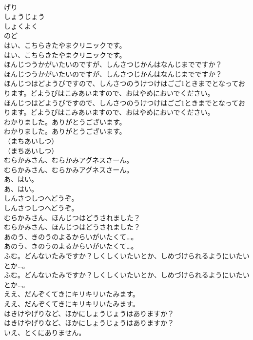 \documentclass[8pt]{extreport}
\begin{document}
\begin{CJK}{UTF8}{min}
\\	げり
\\	しょうじょう
\\	しょくよく
\\	のど
\\	はい、こちらきたやまクリニックです。	
\\	はい、こちらきたやまクリニックです。 
\\	ほんじつうかがいたいのですが、しんさつじかんはなんじまでですか？	
\\	ほんじつうかがいたいのですが、しんさつじかんはなんじまでですか？ 
\\	ほんじつはどようびですので、しんさつのうけつけはごご1ときまでとなっております。どようびはこみあいますので、おはやめにおいでください。	
\\	ほんじつはどようびですので、しんさつのうけつけはごご1ときまでとなっております。どようびはこみあいますので、おはやめにおいでください。 
\\	わかりました。ありがとうございます。	
\\	わかりました。ありがとうございます。 
\\	（まちあいしつ）	
\\	（まちあいしつ） 
\\	むらかみさん、むらかみアグネスさーん。	
\\	むらかみさん、むらかみアグネスさーん。 
\\	あ、はい。	
\\	あ、はい。 
\\	しんさつしつへどうぞ。	
\\	しんさつしつへどうぞ。 
\\	むらかみさん、ほんじつはどうされました？	
\\	むらかみさん、ほんじつはどうされました？ 
\\	あのう、きのうのよるからいがいたくて…。	
\\	あのう、きのうのよるからいがいたくて…。 
\\	ふむ。どんないたみですか？しくしくいたいとか、しめづけられるようにいたいとか…。	
\\	ふむ。どんないたみですか？しくしくいたいとか、しめづけられるようにいたいとか…。 
\\	ええ、だんぞくてきにキリキリいたみます。	
\\	ええ、だんぞくてきにキリキリいたみます。 
\\	はきけやげりなど、ほかにしょうじょうはありますか？	
\\	はきけやげりなど、ほかにしょうじょうはありますか？ 
\\	いえ、とくにありません。	

\end{CJK}
\end{document}
